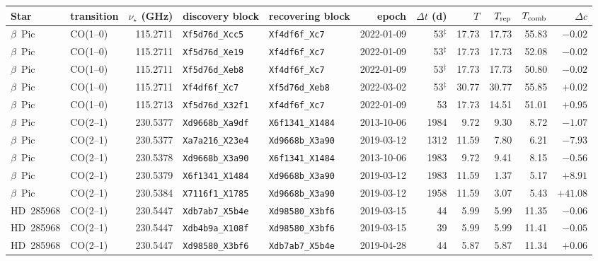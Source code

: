 \begin{tabular}{@{}llrllrrrrrr@{}}
\hline
Star & transition & $\nu_\star$ (GHz) & discovery block & recovering block & epoch & $\Delta t$ (d) & $T$ & $T_{\rm rep}$ & $T_{\rm comb}$ & $\Delta c$ \\
\hline
$\beta$~Pic & CO(1--0) & 115.2711 & \texttt{Xf5d76d\_Xcc5} & \texttt{Xf4df6f\_Xc7} & 2022-01-09 & 53$^\ddagger$ & 17.73 & 17.73 & 55.83 & $-0.02$ \\
$\beta$~Pic & CO(1--0) & 115.2711 & \texttt{Xf5d76d\_Xe19} & \texttt{Xf4df6f\_Xc7} & 2022-01-09 & 53$^\ddagger$ & 17.73 & 17.73 & 52.08 & $-0.02$ \\
$\beta$~Pic & CO(1--0) & 115.2711 & \texttt{Xf5d76d\_Xeb8} & \texttt{Xf4df6f\_Xc7} & 2022-01-09 & 53$^\ddagger$ & 17.73 & 17.73 & 50.80 & $-0.02$ \\
$\beta$~Pic & CO(1--0) & 115.2711 & \texttt{Xf4df6f\_Xc7} & \texttt{Xf5d76d\_Xeb8} & 2022-03-02 & 53$^\ddagger$ & 30.77 & 30.77 & 55.85 & $+0.02$ \\
$\beta$~Pic & CO(1--0) & 115.2713 & \texttt{Xf5d76d\_X32f1} & \texttt{Xf4df6f\_Xc7} & 2022-01-09 & 53 & 17.73 & 14.51 & 51.01 & $+0.95$ \\
$\beta$~Pic & CO(2--1) & 230.5377 & \texttt{Xd9668b\_Xa9df} & \texttt{X6f1341\_X1484} & 2013-10-06 & 1984 & 9.72 & 9.30 & 8.72 & $-1.07$ \\
$\beta$~Pic & CO(2--1) & 230.5377 & \texttt{Xa7a216\_X23e4} & \texttt{Xd9668b\_X3a90} & 2019-03-12 & 1312 & 11.59 & 7.80 & 6.21 & $-7.93$ \\
$\beta$~Pic & CO(2--1) & 230.5378 & \texttt{Xd9668b\_X3a90} & \texttt{X6f1341\_X1484} & 2013-10-06 & 1983 & 9.72 & 9.41 & 8.15 & $-0.56$ \\
$\beta$~Pic & CO(2--1) & 230.5379 & \texttt{X6f1341\_X1484} & \texttt{Xd9668b\_X3a90} & 2019-03-12 & 1983 & 11.59 & 1.37 & 5.17 & $+8.91$ \\
$\beta$~Pic & CO(2--1) & 230.5384 & \texttt{X7116f1\_X1785} & \texttt{Xd9668b\_X3a90} & 2019-03-12 & 1958 & 11.59 & 3.07 & 5.43 & $+41.08$ \\
HD~285968 & CO(2--1) & 230.5447 & \texttt{Xdb7ab7\_X5b4e} & \texttt{Xd98580\_X3bf6} & 2019-03-15 & 44 & 5.99 & 5.99 & 11.35 & $-0.06$ \\
HD~285968 & CO(2--1) & 230.5447 & \texttt{Xdb4b9a\_X108f} & \texttt{Xd98580\_X3bf6} & 2019-03-15 & 39 & 5.99 & 5.99 & 11.41 & $-0.05$ \\
HD~285968 & CO(2--1) & 230.5447 & \texttt{Xd98580\_X3bf6} & \texttt{Xdb7ab7\_X5b4e} & 2019-04-28 & 44 & 5.87 & 5.87 & 11.34 & $+0.06$ \\
\hline
\end{tabular}
